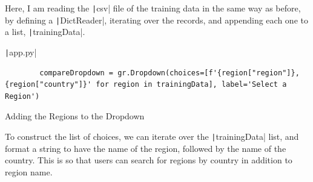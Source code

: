 \documentclass[12pt]{report}
\newcommand{\pil}[1]{\protect\texttt|#1|}
\begin{document}
Here, I am reading the \pil{csv} file of the training data in the same way as before, by defining a \pil{DictReader}, iterating over the records, and appending each one to a list, \pil{trainingData}.

\begin{listing}[H]
\pil{app.py}
\begin{verbatim}
        compareDropdown = gr.Dropdown(choices=[f'{region["region"]}, {region["country"]}' for region in trainingData], label='Select a Region')
\end{verbatim}
\caption{Adding the Regions to the Dropdown}\label{cs:allRegionsDropdown}
\end{listing}

To construct the list of choices, we can iterate over the \pil{trainingData} list, and format a string to have the name of the region, followed by the name of the country. This is so that users can search for regions by country in addition to region name.
\end{document}
